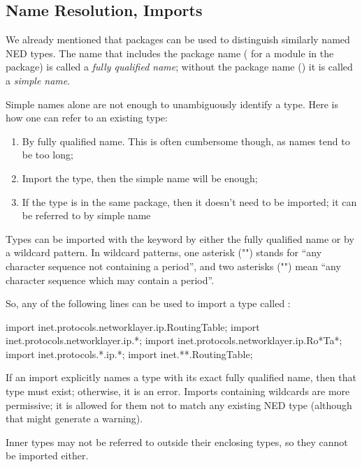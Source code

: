 \subsection{Name Resolution, Imports}
\label{sec:ned-lang:imports-and-name-resolution}

We already mentioned that packages can be used to distinguish similarly named
NED types. The name that includes the package name ( for a
 module in the  package) is called a \textit{fully
qualified name}; without the package name () it is called a
\textit{simple name}.

Simple names alone are not enough to unambiguously identify a type. Here is how
one can refer to an existing type:

\begin{enumerate}
  \item By fully qualified name. This is often cumbersome though, as names tend to be too long;
  \item Import the type, then the simple name will be enough;
  \item If the type is in the same package, then it doesn't need to be imported;
    it can be referred to by simple name
\end{enumerate}

Types can be imported with the  keyword by either the fully
qualified name or by a wildcard pattern. In wildcard patterns, one asterisk
("\ttt{*}") stands for ``any character sequence not containing a period'', and two
asterisks ("\ttt{**}") mean ``any character sequence which may contain a period''.

So, any of the following lines can be used to import a type called
:

\begin{ned}
import inet.protocols.networklayer.ip.RoutingTable;
import inet.protocols.networklayer.ip.*;
import inet.protocols.networklayer.ip.Ro*Ta*;
import inet.protocols.*.ip.*;
import inet.**.RoutingTable;
\end{ned}

If an import explicitly names a type with its exact fully qualified name, then
that type must exist; otherwise, it is an error. Imports containing wildcards
are more permissive; it is allowed for them not to match any existing NED type
(although that might generate a warning).

Inner types may not be referred to outside their enclosing types, so they cannot
be imported either.


